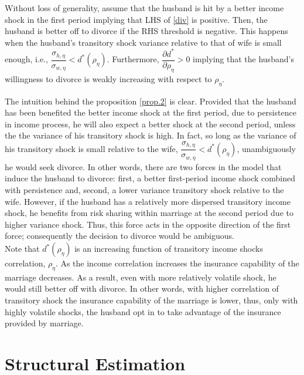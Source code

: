\begin{prop}
Without loss of generality, assume that the husband is hit by a better income shock in the first period implying that LHS of \eqref{div} is positive. Then, the husband is better off to divorce if the RHS threshold is negative. This happens when the husband's transitory shock variance relative to that of wife is small enough, i.e.,  \( \dfrac{\sigma_{h, \eta}}{\sigma_{w,\eta} } < d^*(\rho_\eta)\). Furthermore,  \( \dfrac{\partial d^*}{\partial \rho_{\eta}} > 0\) implying that the husband's willingness to divorce is weakly increasing with respect to $\rho_\eta$.  \label{prop.2}
\end{prop}

The intuition behind the proposition \eqref{prop.2} is clear. Provided that the husband has been benefited the better income shock at the first period, due to persistence in income process, he will also expect a better shock at the second period, unless the the variance of his transitory shock is high. In fact, so long as the variance of his transitory shock is small relative to the wife,  \( \dfrac{\sigma_{h, \eta}}{\sigma_{w,\eta} } < d^*(\rho_\eta)\), unambiguously he would seek divorce. In other words, there are two forces in the model that induce the husband to divorce: first, a better first-period income shock combined with persistence and, second, a lower variance transitory shock relative to the wife. However, if the husband has a relatively more dispersed transitory income shock, he benefits from risk sharing within marriage at the second period due to higher variance shock. Thus, this force acts in the opposite direction of the first force; consequently the decision to divorce would be ambiguous.  \\

Note that $d^*(\rho_\eta)$ is an increasing function of transitory income shocks correlation, $\rho_\eta$.  As the income correlation increases the insurance capability of the marriage decreases. As a result, even with more relatively volatile shock, he would still better off with divorce. In other words, with higher correlation of transitory shock the insurance capability of the marriage is lower, thus, only with highly volatile shocks, the husband opt in to take advantage of the insurance provided by marriage.     \\
  

\section{Structural Estimation}

